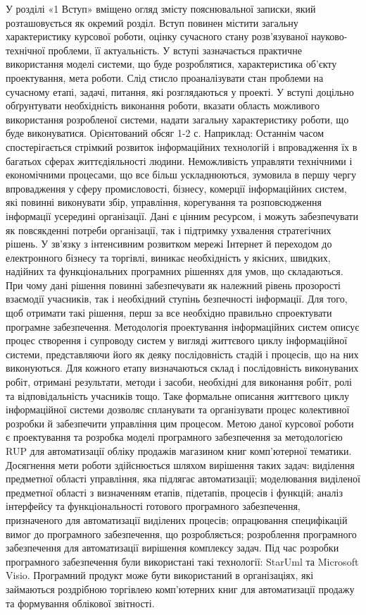 У розділі «1 Вступ» вміщено огляд змісту пояснювальної записки, який  розташовується як окремий розділ.
Вступ повинен містити загальну характеристику курсової роботи, оцінку сучасного стану розв'язуваної науково-технічної проблеми, її актуальність.
У вступі зазначається практичне використання моделі системи, що буде розроблятися, характеристика об’єкту проектування, мета роботи. Слід стисло проаналізувати стан проблеми на сучасному етапі, задачі, питання, які розглядаються у проекті. У вступі доцільно обґрунтувати необхідність виконання роботи, вказати область можливого використання розробленої системи, надати загальну характеристику  роботи, що буде виконуватися. 
Орієнтований обсяг 1-2 с.
Наприклад:
Останнім часом спостерігається стрімкий розвиток інформаційних технологій і впровадження їх в багатьох сферах життєдіяльності людини. Неможливість управляти технічними і економічними процесами, що все більш ускладнюються, зумовила в першу чергу впровадження у сферу промисловості, бізнесу, комерції інформаційних систем, які повинні виконувати збір, управління, корегування та розповсюдження інформації усередині організації. Дані є цінним ресурсом, і можуть забезпечувати як повсякденні потреби організації, так і підтримку ухвалення стратегічних рішень. У зв’язку з інтенсивним розвитком мережі Інтернет й переходом до електронного бізнесу та торгівлі, виникає необхідність у якісних, швидких, надійних та функціональних програмних рішеннях для умов, що складаються. При чому дані рішення повинні забезпечувати як належний рівень прозорості взаємодії учасників, так і необхідний ступінь безпечності інформації. Для того, щоб отримати такі рішення, перш за все необхідно правильно спроектувати програмне забезпечення. Методологія проектування інформаційних систем описує процес створення і супроводу систем у вигляді життєвого циклу інформаційної системи, представляючи його як деяку послідовність стадій і процесів, що на них виконуються. Для кожного етапу визначаються склад і послідовність виконуваних робіт, отримані результати, методи і засоби, необхідні для виконання робіт, ролі та відповідальність учасників тощо. Таке формальне описання життєвого циклу інформаційної системи дозволяє спланувати та організувати процес колективної розробки й забезпечити управління цим процесом. Метою даної курсової роботи є проектування та розробка моделі програмного забезпечення за методологією RUP для автоматизації обліку продажів магазином книг комп’ютерної тематики. Досягнення мети роботи здійснюється шляхом вирішення таких задач: виділення предметної області управління, яка підлягає автоматизації; моделювання виділеної предметної області з визначенням етапів, підетапів, процесів і функцій; аналіз інтерфейсу та функціональності готового програмного забезпечення, призначеного для автоматизації виділених процесів; опрацювання специфікацій вимог до програмного забезпечення, що розробляється; розроблення програмного забезпечення для автоматизації вирішення комплексу задач. Під час  розробки програмного забезпечення були використані такі технології: StarUml та Microsoft Visio. Програмний продукт може бути використаний в організаціях, які займаються роздрібною торгівлею комп’ютерних книг для автоматизації продажу та формування облікової звітності. 

